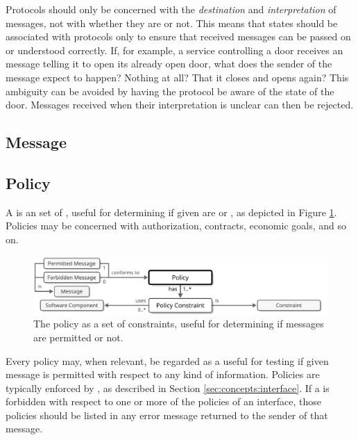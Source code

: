 Protocols should only be concerned with the \textit{destination} and \textit{interpretation} of messages, not with whether they are  or not.
This means that states should be associated with protocols only to ensure that received messages can be passed on or understood correctly.
If, for example, a service controlling a door receives an message telling it to open its already open door, what does the sender of the message expect to happen?
Nothing at all?
That it closes and opens again?
This ambiguity can be avoided by having the protocol be aware of the state of the door.
Messages received when their interpretation is unclear can then be rejected.

\subsection{Message}
\label{sec:concepts:message}

\newpage

\subsection{Policy}
\label{sec:concepts:policy}

A  is an  set of , useful for determining if given  are  or , as depicted in Figure \ref{fig:policy}.
Policies may be concerned with authorization, contracts, economic goals, and so on.

\begin{figure}[ht!]
  \centering
  \includegraphics[scale=0.9]{figures/policy}
  \caption{
    The policy as a set of constraints, useful for determining if messages are permitted or not.
  }
  \label{fig:policy}
\end{figure}

Every policy may, when relevant, be regarded as a  useful for testing if given message is permitted with respect to any kind of information.
Policies are typically enforced by , as described in Section \ref{sec:concepts:interface}.
If a  is forbidden with respect to one or more of the policies of an interface, those policies should be listed in any error message returned to the sender of that message.

